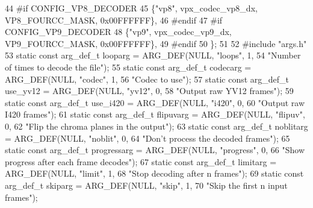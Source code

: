 \begin{DoxyCodeInclude}
44 \textcolor{preprocessor}{#if CONFIG\_VP8\_DECODER}
45   \{\textcolor{stringliteral}{"vp8"},  vpx\_codec\_vp8\_dx,   VP8\_FOURCC\_MASK, 0x00FFFFFF\},
46 \textcolor{preprocessor}{#endif}
47 \textcolor{preprocessor}{#if CONFIG\_VP9\_DECODER}
48   \{\textcolor{stringliteral}{"vp9"},  vpx\_codec\_vp9\_dx,   VP9\_FOURCC\_MASK, 0x00FFFFFF\},
49 \textcolor{preprocessor}{#endif}
50 \};
51 
52 \textcolor{preprocessor}{#include "args.h"}
53 \textcolor{keyword}{static} \textcolor{keyword}{const} arg\_def\_t looparg = ARG\_DEF(NULL, \textcolor{stringliteral}{"loops"}, 1,
54                                           \textcolor{stringliteral}{"Number of times to decode the file"});
55 \textcolor{keyword}{static} \textcolor{keyword}{const} arg\_def\_t codecarg = ARG\_DEF(NULL, \textcolor{stringliteral}{"codec"}, 1,
56                                           \textcolor{stringliteral}{"Codec to use"});
57 \textcolor{keyword}{static} \textcolor{keyword}{const} arg\_def\_t use\_yv12 = ARG\_DEF(NULL, \textcolor{stringliteral}{"yv12"}, 0,
58                                           \textcolor{stringliteral}{"Output raw YV12 frames"});
59 \textcolor{keyword}{static} \textcolor{keyword}{const} arg\_def\_t use\_i420 = ARG\_DEF(NULL, \textcolor{stringliteral}{"i420"}, 0,
60                                           \textcolor{stringliteral}{"Output raw I420 frames"});
61 \textcolor{keyword}{static} \textcolor{keyword}{const} arg\_def\_t flipuvarg = ARG\_DEF(NULL, \textcolor{stringliteral}{"flipuv"}, 0,
62                                            \textcolor{stringliteral}{"Flip the chroma planes in the output"});
63 \textcolor{keyword}{static} \textcolor{keyword}{const} arg\_def\_t noblitarg = ARG\_DEF(NULL, \textcolor{stringliteral}{"noblit"}, 0,
64                                            \textcolor{stringliteral}{"Don't process the decoded frames"});
65 \textcolor{keyword}{static} \textcolor{keyword}{const} arg\_def\_t progressarg = ARG\_DEF(NULL, \textcolor{stringliteral}{"progress"}, 0,
66                                              \textcolor{stringliteral}{"Show progress after each frame decodes"});
67 \textcolor{keyword}{static} \textcolor{keyword}{const} arg\_def\_t limitarg = ARG\_DEF(NULL, \textcolor{stringliteral}{"limit"}, 1,
68                                           \textcolor{stringliteral}{"Stop decoding after n frames"});
69 \textcolor{keyword}{static} \textcolor{keyword}{const} arg\_def\_t skiparg = ARG\_DEF(NULL, \textcolor{stringliteral}{"skip"}, 1,
70                                          \textcolor{stringliteral}{"Skip the first n input frames"});

\end{DoxyCodeInclude}
